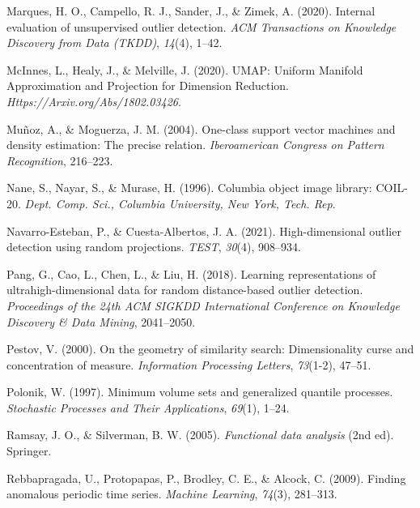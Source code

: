\documentclass[
  10pt]{article}
\newlength{\cslhangindent}
\newlength{\cslentryspacingunit} %
\newenvironment{CSLReferences}[2] %
 {%
  \setlength{\parindent}{0pt}
  \ifodd #1
  \let\oldpar\par
  \def\par{\hangindent=\cslhangindent\oldpar}
  \fi
  \setlength{\parskip}{#2\cslentryspacingunit}
 }%
 {}
\begin{document}
\begin{CSLReferences}{1}{0}
\leavevmode{}%
Marques, H. O., Campello, R. J., Sander, J., \& Zimek, A. (2020). Internal evaluation of unsupervised outlier detection. \emph{ACM Transactions on Knowledge Discovery from Data (TKDD)}, \emph{14}(4), 1--42.

\leavevmode{}%
McInnes, L., Healy, J., \& Melville, J. (2020). {UMAP}: {Uniform} {Manifold} {Approximation} and {Projection} for {Dimension} {Reduction}. \emph{Https://Arxiv.org/Abs/1802.03426}.

\leavevmode{}%
Muñoz, A., \& Moguerza, J. M. (2004). One-class support vector machines and density estimation: The precise relation. \emph{Iberoamerican Congress on Pattern Recognition}, 216--223.

\leavevmode{}%
Nane, S., Nayar, S., \& Murase, H. (1996). Columbia object image library: COIL-20. \emph{Dept. Comp. Sci., Columbia University, New York, Tech. Rep}.

\leavevmode{}%
Navarro-Esteban, P., \& Cuesta-Albertos, J. A. (2021). High-dimensional outlier detection using random projections. \emph{TEST}, \emph{30}(4), 908--934.

\leavevmode{}%
Pang, G., Cao, L., Chen, L., \& Liu, H. (2018). Learning representations of ultrahigh-dimensional data for random distance-based outlier detection. \emph{Proceedings of the 24th ACM SIGKDD International Conference on Knowledge Discovery \& Data Mining}, 2041--2050.

\leavevmode{}%
Pestov, V. (2000). On the geometry of similarity search: Dimensionality curse and concentration of measure. \emph{Information Processing Letters}, \emph{73}(1-2), 47--51.

\leavevmode{}%
Polonik, W. (1997). Minimum volume sets and generalized quantile processes. \emph{Stochastic Processes and Their Applications}, \emph{69}(1), 1--24.

\leavevmode{}%
Ramsay, J. O., \& Silverman, B. W. (2005). \emph{Functional data analysis} (2nd ed). Springer.

\leavevmode{}%
Rebbapragada, U., Protopapas, P., Brodley, C. E., \& Alcock, C. (2009). Finding anomalous periodic time series. \emph{Machine Learning}, \emph{74}(3), 281--313.


\end{CSLReferences}
\end{document}
